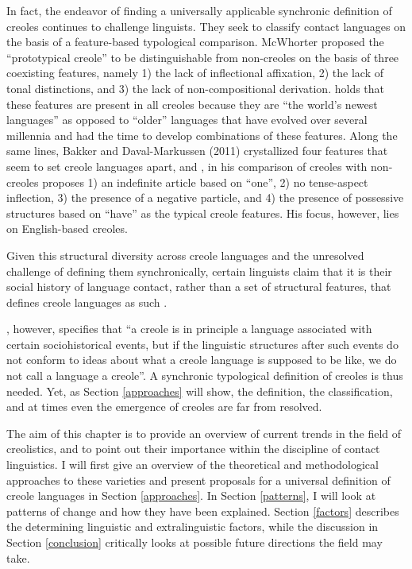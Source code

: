 \documentclass[output=paper,
modfonts
]{langscibook}
\begin{document}
In fact, the endeavor of finding a universally applicable synchronic definition of creoles continues to challenge linguists. They seek to classify contact languages on the basis of a feature-based typological comparison. McWhorter \cite{mcworther1998identifying, mcworther2005defining} proposed the “prototypical creole” to be distinguishable from non-creoles on the basis of three coexisting features, namely 1) the lack of inflectional affixation, 2) the lack of tonal distinctions, and 3) the lack of non-compositional derivation. \cite[5]{mcworther2005defining} holds that these features are present in all creoles because they are “the world’s newest languages” as opposed to “older” languages that have evolved over several millennia and had the time to develop combinations of these features. Along the same lines, Bakker and Daval-Markussen (2011) crystallized four features that seem to set creole languages apart, and \cite[14]{daval2014first}, in his comparison of creoles with non-creoles proposes 1) an indefinite article based on “one”, 2) no tense-aspect inflection, 3) the presence of a negative particle, and 4) the presence of possessive structures based on “have” as the typical creole features. His focus, however, lies on English-based creoles.

Given this structural diversity across creole languages and the unresolved challenge of defining them synchronically, certain linguists claim that it is their social history of language contact, rather than a set of structural features, that defines creole languages as such \citep[cf.][]{mufwene2000creolization, chaudenson2001creolization, mufwene2001ecology, degraff2005linguists, mufwene2008language}.

\cite[15]{bakker2017key}, however, specifies that “a creole is in principle a language associated with certain sociohistorical events, but if the linguistic structures after such events do not conform to ideas about what a creole language is supposed to be like, we do not call a language a creole”. A synchronic typological definition of creoles is thus needed. Yet, as Section \ref{approaches} will show, the definition, the classification, and at times even the emergence of creoles are far from resolved.
	
The aim of this chapter is to provide an overview of current trends in the field of creolistics, and to point out their importance within the discipline of contact linguistics. I will first give an overview of the theoretical and methodological approaches to these varieties and present proposals for a universal definition of creole languages in Section \ref{approaches}. In Section \ref{patterns}, I will look at patterns of change and how they have been explained. Section \ref{factors} describes the determining linguistic and extralinguistic factors, while the discussion in Section \ref{conclusion} critically looks at possible future directions the field may take.
\end{document}
